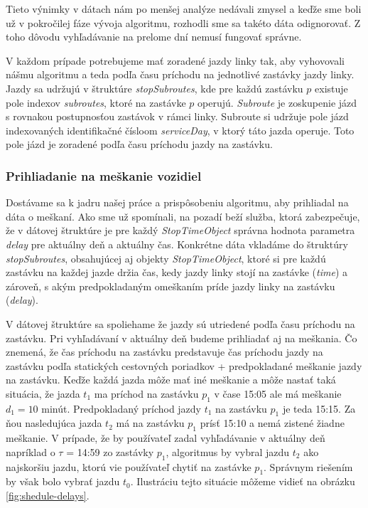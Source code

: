Tieto výnimky v dátach nám po menšej analýze nedávali zmysel a keďže sme boli už v pokročilej fáze vývoja algoritmu, rozhodli sme sa takéto dáta odignorovať. Z toho dôvodu vyhľadávanie na prelome dní nemusí fungovať správne.

V každom prípade potrebujeme mať zoradené jazdy linky tak, aby vyhovovali nášmu algoritmu a teda podľa času príchodu na jednotlivé zastávky jazdy linky. Jazdy sa udržujú v štruktúre \textit{stopSubroutes}, kde pre každú zastávku $p$ existuje pole indexov \textit{subroutes}, ktoré na zastávke $p$ operujú. \textit{Subroute} je zoskupenie jázd s rovnakou postupnosťou zastávok v rámci linky. Subroute si udržuje pole jázd indexovaných identifikačné čísloom \textit{serviceDay}, v ktorý táto jazda operuje. Toto pole jázd je zoradené podľa času príchodu jazdy na zastávku. 

\subsubsection{Prihliadanie na meškanie vozidiel}
Dostávame sa k jadru našej práce a prispôsobeniu algoritmu, aby prihliadal na dáta o meškaní. Ako sme už spomínali, na pozadí beží služba, ktorá zabezpečuje, že v dátovej štruktúre je pre každý \textit{StopTimeObject} správna hodnota parametra \textit{delay} pre aktuálny deň a aktuálny čas. 
Konkrétne dáta vkladáme do štruktúry \textit{stopSubroutes}, obsahujúcej aj objekty \textit{StopTimeObject}, ktoré si pre každú zastávku na každej jazde držia čas, kedy jazdy linky stojí na zastávke (\textit{time}) a zároveň, s akým predpokladaným omeškaním príde jazdy linky na zastávku (\textit{delay}). 

V dátovej štruktúre sa spoliehame že jazdy sú utriedené podľa času príchodu na zastávku. Pri vyhľadávaní v aktuálny deň budeme prihliadať aj na meškania. Čo znemená, že čas príchodu na zastávku predstavuje čas príchodu jazdy na zastávku podľa statických cestovných poriadkov + predpokladané meškanie jazdy na zastávku. Keďže každá jazda môže mať iné meškanie a môže nastať taká situácia, že jazda $t_1$ ma príchod na zastávku $p_1$ v čase 15:05 ale má meškanie $d_1=10$ minút. Predpokladaný príchod jazdy $t_1$ na zastávku $p_1$ je teda 15:15. Za ňou nasledujúca jazda $t_2$ má na zastávku $p_1$ prísť 15:10 a nemá zistené žiadne meškanie. V prípade, že by používateľ zadal vyhľadávanie v aktuálny deň napríklad o $\tau$ = 14:59 zo zastávky $p_1$, algoritmus by vybral jazdu $t_2$ ako najskoršiu jazdu, ktorú vie používateľ chytiť na zastávke $p_1$. Správnym riešením by však bolo vybrať jazdu $t_0$. Ilustráciu tejto situácie môžeme vidieť na obrázku \ref{fig:shedule-delays}. 

